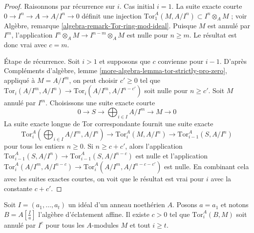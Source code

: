\begin{proof}
Raisonnons par récurrence sur $i$. Cas initial $i = 1$. La suite exacte courte $0 \to I^n \to A \to A/I^n \to 0$ définit une injection $\text{Tor}_1^A(M, A/I^n) \subset I^n \otimes_A M$ ; voir Algèbre, remarque \ref{algebra-remark-Tor-ring-mod-ideal}. Puisque $M$ est annulé par $I^m$, l'application $I^n \otimes_A M \to I^{n - m} \otimes_A M$ est nulle pour $n \geq m$. Le résultat est donc vrai avec $c = m$.

\medskip\noindent
Étape de récurrence. Soit $i > 1$ et supposons que $c$ convienne pour $i - 1$. D'après Compléments d'algèbre, lemme \ref{more-algebra-lemma-tor-strictly-pro-zero}, appliqué à $M = A/I^m$, on peut choisir $c' \geq 0$ tel que $\text{Tor}_i(A/I^m, A/I^n) \to \text{Tor}_i(A/I^m, A/I^{n - c'})$ soit nulle pour $n \geq c'$. Soit $M$ annulé par $I^m$. Choisissons une suite exacte courte
$$
0 \to S \to \bigoplus\nolimits_{i \in I} A/I^m \to M \to 0
$$
La suite exacte longue de Tor correspondante fournit une suite exacte
$$
\text{Tor}_i^A(\bigoplus\nolimits_{i \in I} A/I^m, A/I^n) \to
\text{Tor}_i^A(M, A/I^n) \to
\text{Tor}_{i - 1}^A(S, A/I^n)
$$
pour tous les entiers $n \geq 0$. Si $n \geq c + c'$, alors l'application $\text{Tor}_{i - 1}^A(S, A/I^n) \to \text{Tor}_{i - 1}^A(S, A/I^{n - c})$ est nulle et l'application $\text{Tor}_i^A(A/I^m, A/I^{n - c}) \to 
\text{Tor}_i^A(A/I^m, A/I^{n - c - c'})$ est nulle. En combinant cela avec les suites exactes courtes, on voit que le résultat est vrai pour $i$ avec la constante $c + c'$.

\end{proof}

\begin{lemma}
\label{lemma-annihilates-affine}
Soit $I = (a_1, \ldots, a_t)$ un idéal d'un anneau noethérien $A$. Posons $a = a_1$ et notons $B = A[\frac{I}{a}]$ l'algèbre d'éclatement affine. Il existe $c > 0$ tel que $\text{Tor}_i^A(B, M)$ soit annulé par $I^c$ pour tous les $A$-modules $M$ et tout $i \geq t$.
\end{lemma}

